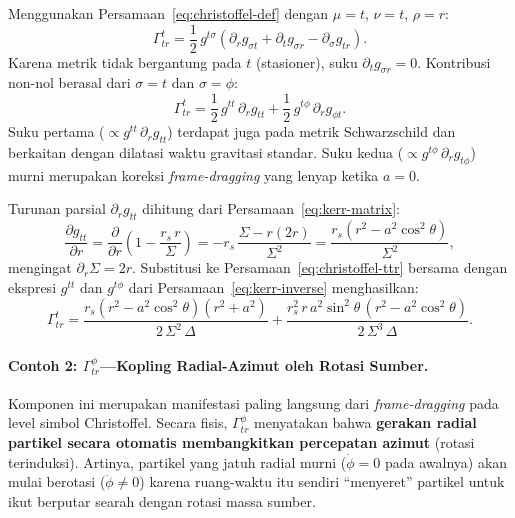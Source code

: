 Menggunakan Persamaan~\eqref{eq:christoffel-def} dengan $\mu = t$, $\nu = t$, $\rho = r$:
\begin{equation}
    \Gamma^t_{tr} = \frac{1}{2}\,g^{t\sigma}
    \left(\partial_r g_{\sigma t} + \partial_t g_{\sigma r} - \partial_\sigma g_{tr}\right).
\end{equation}
Karena metrik tidak bergantung pada $t$ (stasioner), suku $\partial_t g_{\sigma r} = 0$. Kontribusi non-nol berasal dari $\sigma = t$ dan $\sigma = \phi$:
\begin{equation}
    \Gamma^t_{tr} = \frac{1}{2}\,g^{tt}\,\partial_r g_{tt}
                  + \frac{1}{2}\,g^{t\phi}\,\partial_r g_{\phi t}.
    \label{eq:christoffel-ttr}
\end{equation}
Suku pertama ($\propto g^{tt}\,\partial_r g_{tt}$) terdapat juga pada metrik Schwarzschild dan berkaitan dengan dilatasi waktu gravitasi standar. Suku kedua ($\propto g^{t\phi}\,\partial_r g_{t\phi}$) murni merupakan koreksi \textit{frame-dragging} yang lenyap ketika $a = 0$.

Turunan parsial $\partial_r g_{tt}$ dihitung dari Persamaan~\eqref{eq:kerr-matrix}:
\begin{equation}
    \frac{\partial g_{tt}}{\partial r}
    = \frac{\partial}{\partial r}\left(1 - \frac{r_s\, r}{\Sigma}\right)
    = -r_s\,\frac{\Sigma - r(2r)}{\Sigma^2}
    = \frac{r_s(r^2 - a^2\cos^2\!\theta)}{\Sigma^2},
    \label{eq:dgtt-dr}
\end{equation}
mengingat $\partial_r \Sigma = 2r$. Substitusi ke Persamaan~\eqref{eq:christoffel-ttr} bersama dengan ekspresi $g^{tt}$ dan $g^{t\phi}$ dari Persamaan~\eqref{eq:kerr-inverse} menghasilkan:
\begin{equation}
    \Gamma^t_{tr} = \frac{r_s(r^2 - a^2\cos^2\!\theta)(r^2 + a^2)}{2\,\Sigma^2\,\Delta}
    + \frac{r_s^2\, r\, a^2\sin^2\!\theta\,(r^2 - a^2\cos^2\!\theta)}{2\,\Sigma^3\,\Delta}.
    \label{eq:gamma-ttr-result}
\end{equation}

\paragraph{Contoh 2: $\Gamma^\phi_{tr}$---Kopling Radial-Azimut oleh Rotasi Sumber.}
Komponen ini merupakan manifestasi paling langsung dari \textit{frame-dragging} pada level simbol Christoffel. Secara fisis, $\Gamma^\phi_{tr}$ menyatakan bahwa \textbf{gerakan radial partikel secara otomatis membangkitkan percepatan azimut} (rotasi terinduksi). Artinya, partikel yang jatuh radial murni ($\dot{\phi} = 0$ pada awalnya) akan mulai berotasi ($\ddot{\phi} \neq 0$) karena ruang-waktu itu sendiri ``menyeret'' partikel untuk ikut berputar searah dengan rotasi massa sumber.

